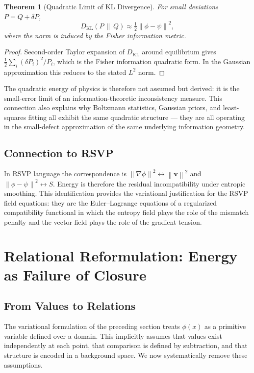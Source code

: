 \documentclass[12pt,a4paper,openany]{book}
\theoremstyle{plain}
\newtheorem{theorem}{Theorem}[chapter]
\theoremstyle{definition}
\theoremstyle{remark}
\newcommand{\norm}[1]{\left\|#1\right\|}
\begin{document}
\begin{theorem}[Quadratic Limit of KL Divergence]
For small deviations $P = Q + \delta P$,
\[
D_{\mathrm{KL}}(P \,\|\, Q) \approx \tfrac{1}{2}\norm{\phi - \psi}^2,
\]
where the norm is induced by the Fisher information metric.
\end{theorem}

\begin{proof}
Second-order Taylor expansion of $D_{\mathrm{KL}}$ around equilibrium gives $\frac{1}{2}\sum_i(\delta P_i)^2/P_i$, which is the Fisher information quadratic form. In the Gaussian approximation this reduces to the stated $L^2$ norm.
\end{proof}

The quadratic energy of physics is therefore not assumed but derived: it is the small-error limit of an information-theoretic inconsistency measure. This connection also explains why Boltzmann statistics, Gaussian priors, and least-squares fitting all exhibit the same quadratic structure — they are all operating in the small-defect approximation of the same underlying information geometry.

\subsection{Connection to RSVP}

In RSVP language the correspondence is $\norm{\nabla\phi}^2 \leftrightarrow \norm{\mathbf{v}}^2$ and $\norm{\phi - \psi}^2 \leftrightarrow S$. Energy is therefore the residual incompatibility under entropic smoothing. This identification provides the variational justification for the RSVP field equations: they are the Euler--Lagrange equations of a regularized compatibility functional in which the entropy field plays the role of the mismatch penalty and the vector field plays the role of the gradient tension.

\section{Relational Reformulation: Energy as Failure of Closure}
\label{sec:relational_reformulation}

\subsection{From Values to Relations}

The variational formulation of the preceding section treats $\phi(x)$ as a primitive variable defined over a domain. This implicitly assumes that values exist independently at each point, that comparison is defined by subtraction, and that structure is encoded in a background space. We now systematically remove these assumptions.
\end{document}
